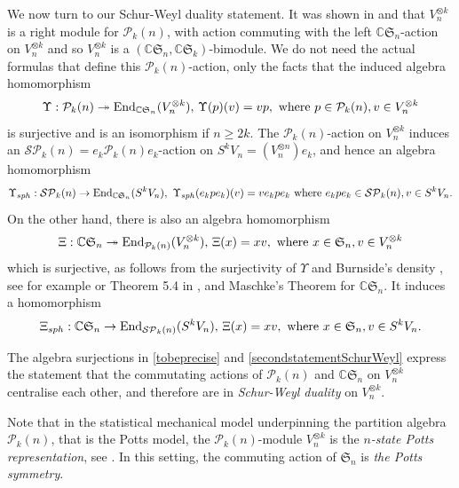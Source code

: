 \documentclass[10pt,hidelinks]{article}
\newcommand{\ParAlg}{{\mathcal P }_{k}}
\newcommand{\SpheAlg}{{\mathcal{SP} }_{k}}
\newcommand{\CC}{ \mathbb C }
\newcommand{\End}{{\rm End}}
\newcommand{\Si}{\mathfrak{S}}
\numberwithin{equation}{section}
\begin{document}
\medskip
We now turn to our Schur-Weyl duality statement. It was shown in \cite{Jones} and \cite{PMartin} that $ V_n^{\otimes k } $ 
is a right module for $  \ParAlg(n)$,  
with action commuting with
the left $ \CC \Si_n $-action on $ V_n^{\otimes k } $ and
so $ V_n^{\otimes k } $ is a $ (\CC \Si_n, \CC \Si_k) $-bimodule. 
We do not need 
the actual formulas that define this $  \ParAlg(n)$-action, only the facts 
that the induced algebra homomorphism 
\begin{equation}\label{tobeprecise}
  \Upsilon:  \ParAlg(n) \twoheadrightarrow \End_{ \CC \Si_n}( V_n^{ \otimes k } ), \,
\Upsilon(p)(v) = vp,  \mbox{ where } p \in \ParAlg(n), v\in  V_n^{ \otimes k }
\end{equation}
is surjective and is an isomorphism if $ n \ge 2k $. 
The $  \ParAlg(n)$-action on $ V_n^{\otimes k } $ 
induces an
$ \SpheAlg(n) =e_k  \ParAlg(n)  e_k $-action on $ S^k V_n = (V_n^{\otimes n }) e_k  $, and hence an 
algebra homomorphism 
\begin{equation}\label{onemayexpect}
  \Upsilon_{sph}:  \SpheAlg(n) \rightarrow \End_{ \CC \Si_n}( S^k V_n ), \, \,
\Upsilon_{sph}(e_k p e_k)(v)   = v   e_k p e_k
 \mbox{ where } e_k p e_k  \in \SpheAlg(n), v\in   S^k V_n. 
\end{equation}
On the other hand, there is also an algebra homomorphism
\begin{equation}\label{secondstatementSchurWeyl}
  \Xi:  \CC \Si_n  \twoheadrightarrow \End_{ \ParAlg(n) }( V_n^{ \otimes k } ), \,
\Xi(x) = x v,  \mbox{ where } x \in \Si_n, v\in  V_n^{ \otimes k }
\end{equation}
which is surjective, as follows from the surjectivity of $ \Upsilon $ 
and 
Burnside's density {\color{black}{theorem}}, see for example
\cite{Lang} or Theorem 5.4 in \cite{HR}, and Maschke's Theorem for $ \CC \Si_n $.
It induces a homomorphism 
\begin{equation}\label{secondstatementSchurWeylA}
  \Xi_{sph}:  \CC \Si_n  \rightarrow \End_{ \SpheAlg(n) }( S^k V_n  ), \,
\Xi(x) = x v,  \mbox{ where } x \in \Si_n, v\in  S^k V_n.
\end{equation}

The algebra surjections in \eqref{tobeprecise} and \eqref{secondstatementSchurWeyl}
express the statement that the commutating actions of $ \ParAlg(n) $ and $  \CC \Si_n $ on $ V^{\otimes k}_n $
centralise each other, and therefore are in 
{\it Schur-Weyl duality}
on $ V_n^{ \otimes k } $. 

\medskip 
Note that in the statistical mechanical model underpinning the partition algebra $ \ParAlg(n) $,
that is the Potts model, the $ \ParAlg(n) $-module $ V^{\otimes k}_n $ is the {\it $n$-state Potts representation},
see \cite[\S8.2]{PMartin}. In this setting, the commuting action of $ \Si_n $ is {\it the Potts symmetry}. 
\end{document}

